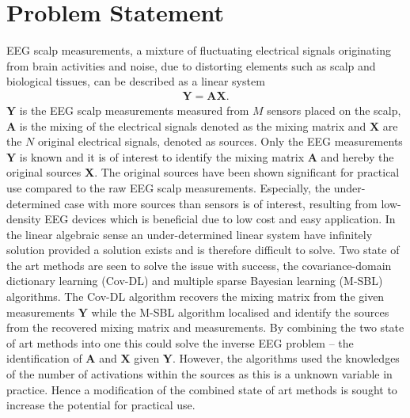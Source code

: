 \chapter{Problem Statement}\label{ch:problemstatement}
EEG scalp measurements, a mixture of fluctuating electrical signals originating from brain activities and noise, due to distorting elements such as scalp and biological tissues, can be described as a linear system
\begin{align*}
\mathbf{Y} = \mathbf{AX}.
\end{align*}
$\mathbf{Y}$ is the EEG scalp measurements measured from $M$ sensors placed on the scalp, $\mathbf{A}$ is the mixing of the electrical signals denoted as the mixing matrix and $\mathbf{X}$ are the $N$ original electrical signals, denoted as sources. 
Only the EEG measurements $\mathbf{Y}$ is known and it is of interest to identify the mixing matrix $\mathbf{A}$ and hereby the original sources $\mathbf{X}$. The original sources have been shown significant for practical use compared to the raw EEG scalp measurements. 
Especially, the under-determined case with more sources than sensors is of interest, resulting from low-density EEG devices which is beneficial due to low cost and easy application. 
In the linear algebraic sense an under-determined linear system have infinitely solution provided a solution exists and is therefore difficult to solve.
Two state of the art methods are seen to solve the issue with success, the covariance-domain dictionary learning (Cov-DL) and multiple sparse Bayesian learning (M-SBL) algorithms. 
The Cov-DL algorithm recovers the mixing matrix from the given measurements $\mathbf{Y}$ while the M-SBL algorithm localised and identify the sources from the recovered mixing matrix and measurements. 
By combining the two state of art methods into one this could solve the inverse EEG problem -- the identification of $\mathbf{A}$ and $\mathbf{X}$ given $\mathbf{Y}$.
However, the algorithms used the knowledges of the number of activations within the sources as this is a unknown variable in practice. Hence a modification of the combined state of art methods is sought to increase the potential for practical use.



